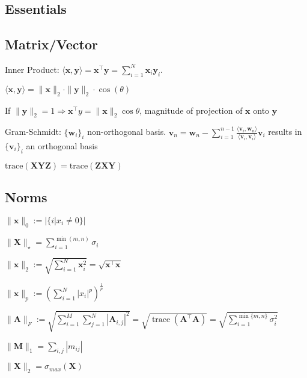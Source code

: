 \documentclass[a4paper, 11pt, landscape]{article}
\begin{document}
\begin{multicols*}{3}


\section{Essentials}
\subsection{Matrix/Vector}
\begin{compactdesc}
	\item[Inner Product:] $\langle \mathbf{x}, \mathbf{y} \rangle = \mathbf{x}^\top \mathbf{y} = \sum_{i=1}^{N} \mathbf{x}_i \mathbf{y}_i$.
	\begin{inparaitem}[\color{red}\textbullet]
		\item $\langle \mathbf{x}, \mathbf{y} \rangle = \|\mathbf{x}\|_2 \cdot \|\mathbf{y}\|_2 \cdot \cos(\theta)$
        \item If $\|\mathbf{y}\|_2 = 1 \Rightarrow \mathbf{x}^\top y = \|\mathbf{x}\|_2 \cos\theta$, magnitude of projection of $\mathbf{x}$ onto $\mathbf{y}$ 
	\end{inparaitem}
	\item[Gram-Schmidt:] $\{\mathbf{w}_i\}_i$ non-orthogonal basis. $\mathbf{v}_n = \mathbf{w}_n - \sum_{i=1}^{n-1} \frac{\langle \mathbf{v}_i, \mathbf{w}_n \rangle}{\langle \mathbf{v}_i, \mathbf{v}_i \rangle} \mathbf{v}_i$ results in $\{\mathbf{v}_i\}_i$ an orthogonal basis
\end{compactdesc}
$\mathrm{trace}(\mathbf{XYZ}) = \mathrm{trace}(\mathbf{ZXY})$

\subsection{Norms}
\begin{inparaitem}[\color{red}\textbullet]
	\item $\|\mathbf{x}\|_0 := |\{i | x_i \neq 0\}|$
	\item $\|\mathbf{X}\|_\star = \sum_{i=1}^{\min(m, n)} \sigma_i$
	\item $\|\mathbf{x}\|_2 := \sqrt{\sum_{i=1}^{N} \mathbf{x}_i^2} = \sqrt{\mathbf{x}^\top \mathbf{x}}$
	\item $\|\mathbf{x}\|_p := \left( \sum_{i=1}^{N} |x_i|^p \right)^{\frac{1}{p}}$
	\item $\|\mathbf{A}\|_F :=\allowbreak \sqrt{\sum_{i=1}^{M} \sum_{j=1}^{N} |\mathbf{A}_{i, j}|^2} =\allowbreak \sqrt{\operatorname{trace}(\mathbf{A}^\top \mathbf{A})} =\allowbreak \sqrt{\sum_{i=1}^{\min\{m, n\}} \sigma_i^2}$
	\item $\|\mathbf{M}\|_1 = \sum_{i,j}|m_{ij}|$
    \item $\|\mathbf{X}\|_2 = \sigma_{max}(\mathbf{X})$
\end{inparaitem}


\end{multicols*}
\end{document}
